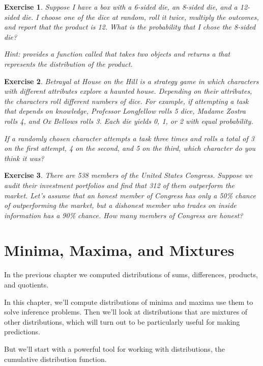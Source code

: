 \documentclass[12pt]{book}
\theoremstyle{exercise}
\newtheorem{exercise}{Exercise}[chapter]
\begin{document}
\begin{exercise}
Suppose I have a box with a 6-sided die, an 8-sided die, and a 12-sided die.
I choose one of the dice at random, roll it twice, multiply the outcomes, and report that the product is 12.
What is the probability that I chose the 8-sided die?

Hint:  provides a function called  that takes two  objects and returns a  that represents the distribution of the product.
\end{exercise}


\begin{exercise}
{\it Betrayal at House on the Hill} is a strategy game in which characters with different attributes explore a haunted house.  Depending on their attributes, the characters roll different numbers of dice.  For example, if attempting a task that depends on knowledge, Professor Longfellow rolls 5 dice, Madame Zostra rolls 4, and Ox Bellows rolls 3.  Each die yields 0, 1, or 2 with equal probability.  

If a randomly chosen character attempts a task three times and rolls a total of 3 on the first attempt, 4 on the second, and 5 on the third, which character do you think it was?
\end{exercise}


\begin{exercise}
There are 538 members of the United States Congress.  
Suppose we audit their investment portfolios and find that 312 of them outperform the market.
Let's assume that an honest member of Congress has only a 50\% chance of outperforming the market, but a dishonest member who trades on inside information has a 90\% chance.  How many members of Congress are honest?
\end{exercise}



\chapter{Minima, Maxima, and Mixtures}

In the previous chapter we computed distributions of sums, differences, products, and quotients.

In this chapter, we'll compute distributions of minima and maxima use them to solve inference problems.
Then we'll look at distributions that are mixtures of other distributions, which will turn out to be particularly useful for making predictions.

But we'll start with a powerful tool for working with distributions, the cumulative distribution function.
\end{document}
